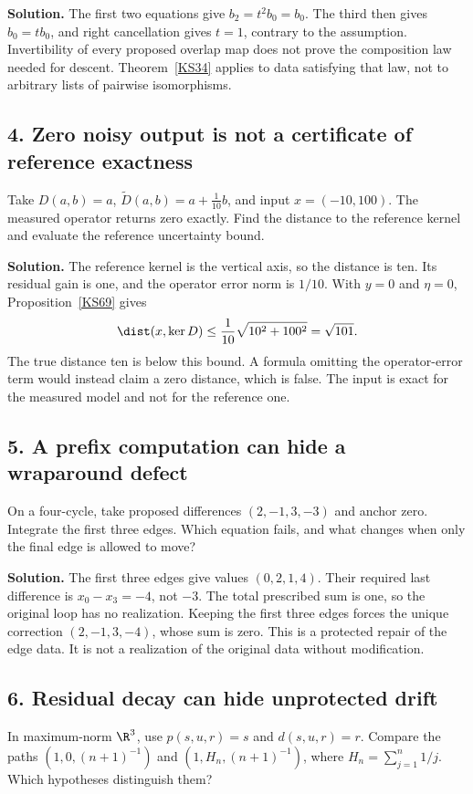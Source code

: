 \textbf{Solution.} The first two equations give \(b_2=t^2b_0=b_0\). The third then gives \(b_0=tb_0\), and right cancellation gives \(t=1\), contrary to the assumption. Invertibility of every proposed overlap map does not prove the composition law needed for descent. Theorem~\ref{KS34} applies to data satisfying that law, not to arbitrary lists of pairwise isomorphisms.

\subsection*{4. Zero noisy output is not a certificate of reference exactness}
Take \(D(a,b)=a\), \(\widetilde D(a,b)=a+\tfrac1{10}b\), and input \(x=(-10,100)\). The measured operator returns zero exactly. Find the distance to the reference kernel and evaluate the reference uncertainty bound.

\textbf{Solution.} The reference kernel is the vertical axis, so the distance is ten. Its residual gain is one, and the operator error norm is \(1/10\). With \(y=0\) and \(\eta=0\), Proposition~\ref{KS69} gives
\[
 \dist(x,\ker D)\le\frac1{10}\sqrt{10^2+100^2}=\sqrt{101}.
\]
The true distance ten is below this bound. A formula omitting the operator-error term would instead claim a zero distance, which is false. The input is exact for the measured model and not for the reference one.

\subsection*{5. A prefix computation can hide a wraparound defect}
On a four-cycle, take proposed differences \((2,-1,3,-3)\) and anchor zero. Integrate the first three edges. Which equation fails, and what changes when only the final edge is allowed to move?

\textbf{Solution.} The first three edges give values \((0,2,1,4)\). Their required last difference is \(x_0-x_3=-4\), not \(-3\). The total prescribed sum is one, so the original loop has no realization. Keeping the first three edges forces the unique correction \((2,-1,3,-4)\), whose sum is zero. This is a protected repair of the edge data. It is not a realization of the original data without modification.

\subsection*{6. Residual decay can hide unprotected drift}
In maximum-norm $\R^3$, use $p(s,u,r)=s$ and $d(s,u,r)=r$. Compare the paths $(1,0,(n+1)^{-1})$ and $(1,H_n,(n+1)^{-1})$, where $H_n=\sum_{j=1}^{n}1/j$. Which hypotheses distinguish them?

